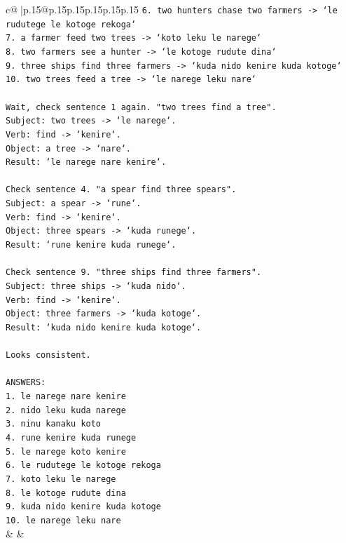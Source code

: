 \documentclass{article}
\begin{document}
{\begin{supertabular}{c@{$\;$}|p{.15\linewidth}@{}p{.15\linewidth}p{.15\linewidth}p{.15\linewidth}p{.15\linewidth}p{.15\linewidth}}
{{{\texttt{6. two hunters chase two farmers {-}> `le rudutege le kotoge rekoga`} \\
\texttt{7. a farmer feed two trees {-}> `koto leku le narege`} \\
\texttt{8. two farmers see a hunter {-}> `le kotoge rudute dina`} \\
\texttt{9. three ships find three farmers {-}> `kuda nido kenire kuda kotoge`} \\
\texttt{10. two trees feed a tree {-}> `le narege leku nare`} \\
\\ 
\texttt{Wait, check sentence 1 again. "two trees find a tree".} \\
\texttt{Subject: two trees {-}> `le narege`.} \\
\texttt{Verb: find {-}> `kenire`.} \\
\texttt{Object: a tree {-}> `nare`.} \\
\texttt{Result: `le narege nare kenire`.} \\
\\ 
\texttt{Check sentence 4. "a spear find three spears".} \\
\texttt{Subject: a spear {-}> `rune`.} \\
\texttt{Verb: find {-}> `kenire`.} \\
\texttt{Object: three spears {-}> `kuda runege`.} \\
\texttt{Result: `rune kenire kuda runege`.} \\
\\ 
\texttt{Check sentence 9. "three ships find three farmers".} \\
\texttt{Subject: three ships {-}> `kuda nido`.} \\
\texttt{Verb: find {-}> `kenire`.} \\
\texttt{Object: three farmers {-}> `kuda kotoge`.} \\
\texttt{Result: `kuda nido kenire kuda kotoge`.} \\
\\ 
\texttt{Looks consistent.} \\
\\ 
\texttt{ANSWERS:} \\
\texttt{1. le narege nare kenire} \\
\texttt{2. nido leku kuda narege} \\
\texttt{3. ninu kanaku koto} \\
\texttt{4. rune kenire kuda runege} \\
\texttt{5. le narege koto kenire} \\
\texttt{6. le rudutege le kotoge rekoga} \\
\texttt{7. koto leku le narege} \\
\texttt{8. le kotoge rudute dina} \\
\texttt{9. kuda nido kenire kuda kotoge} \\
\texttt{10. le narege leku nare} \\
            }
        }
    }
    & & \\ \\


\end{supertabular}}
\end{document}
